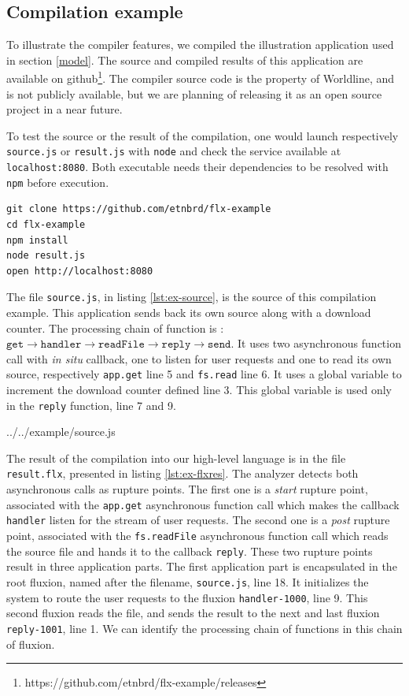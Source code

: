 \subsection{Compilation example}

To illustrate the compiler features, we compiled the illustration application used in section \ref{model}.
The source and compiled results of this application are available on github\cite{flx-example}\footnote{\raggedright https://github.com/etnbrd/flx-example/releases}.
The compiler source code is the property of Worldline, and is not publicly available, but we are planning of releasing it as an open source project in a near future.

To test the source or the result of the compilation, one would launch respectively \texttt{source.js} or \texttt{result.js} with \texttt{node} and check the service available at \texttt{localhost:8080}.
Both executable needs their dependencies to be resolved with \texttt{npm} before execution.
\begin{verbatim}
git clone https://github.com/etnbrd/flx-example
cd flx-example
npm install
node result.js
open http://localhost:8080
\end{verbatim}

The file \texttt{source.js}, in listing \ref{lst:ex-source}, is the source of this compilation example.
This application sends back its own source along with a download counter.
The processing chain of function is : $\texttt{get} \to \texttt{handler} \to \texttt{readFile} \to \texttt{reply} \to \texttt{send}$.
It uses two asynchronous function call with \textit{in situ} callback, one to listen for user requests and one to read its own source, respectively \texttt{app.get} line 5 and \texttt{fs.read} line 6.
It uses a global variable to increment the download counter defined line 3.
This global variable is used only in the \texttt{reply} function, line 7 and 9.

{../../example/source.js}

The result of the compilation into our high-level language is in the file \texttt{result.flx}, presented in listing \ref{lst:ex-flxres}.
The analyzer detects both asynchronous calls as rupture points.
The first one is a \textit{start} rupture point, associated with the \texttt{app.get} asynchronous function call which makes the callback \texttt{handler} listen for the stream of user requests. 
The second one is a \textit{post} rupture point, associated with the \texttt{fs.readFile} asynchronous function call which reads the source file and hands it to the callback \texttt{reply}.
These two rupture points result in three application parts.
The first application part is encapsulated in the root fluxion, named after the filename, \texttt{source.js}, line 18.
It initializes the system to route the user requests to the fluxion \texttt{handler-1000}, line 9.
This second fluxion reads the file, and sends the result to the next and last fluxion \texttt{reply-1001}, line 1.
We can identify the processing chain of functions in this chain of fluxion.

